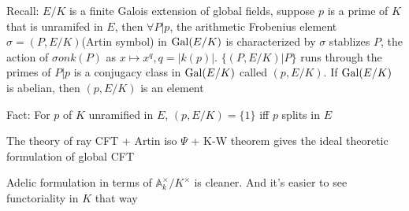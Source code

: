 \documentclass[main]{subfiles}
\begin{document}
Recall: $E/K$ is a finite Galois extension of global fields, suppose $p$ is a prime of $K$ that is unramifed in $E$, then $\forall P|p$, the arithmetic Frobenius element $\sigma=(P,E/K)$(Artin symbol) in $\operatorname{Gal}(E/K)$ is characterized by $\sigma$ stablizes $P$, the action of $\sigma on k(P)$ as $x\mapsto x^q, q=|k(p)|$. $\{(P,E/K)|P\}$ runs through the primes of $P|p$ is a conjugacy class in $\operatorname{Gal}(E/K)$ called $(p,E/K)$. If $\operatorname{Gal}(E/K)$ is abelian, then $(p,E/K)$ is an element

Fact: For $p$ of $K$ unramified in $E$, $(p,E/K)=\{1\}$ iff $p$ splits in $E$

The theory of ray CFT + Artin iso $\Psi$ + K-W theorem  gives the ideal theoretic formulation of global CFT

Adelic formulation in terms of $\mathbb A^\times_k/K^\times$ is cleaner. And it's easier to see functoriality in $K$ that way
\end{document}
